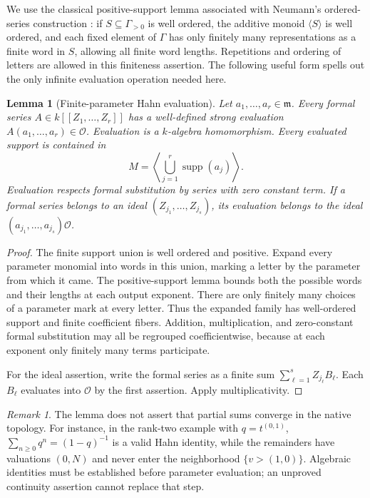 \documentclass[11pt,a4paper]{article}
\numberwithin{equation}{section}
\theoremstyle{plain}
\newtheorem{lemma}[lemma]{Lemma}
\theoremstyle{definition}
\theoremstyle{remark}
\newtheorem{remark}[remark]{Remark}
\newcommand{\OO}{\mathcal O}
\newcommand{\mm}{\mathfrak m}
\newcommand{\supp}{\operatorname{supp}}
\begin{document}
We use the classical positive-support lemma associated with Neumann's
ordered-series construction \cite{Neumann}: if $S\subseteq\Gamma_{>0}$
is well ordered, the additive monoid $\langle S\rangle$ is well ordered,
and each fixed element of $\Gamma$ has only finitely many
representations as a finite word in $S$, allowing all finite word
lengths. Repetitions and ordering of letters are allowed in this
finiteness assertion. The following useful form spells out the only
infinite evaluation operation needed here.

\begin{lemma}[Finite-parameter Hahn evaluation]\label{epd:lem:evaluation}
Let $a_1,\ldots,a_r\in\mm$. Every formal series
$A\in k[[Z_1,\ldots,Z_r]]$ has a well-defined strong evaluation
$A(a_1,\ldots,a_r)\in\OO$. Evaluation is a $k$-algebra homomorphism.
Every evaluated support is contained in
\[
 M=\left\langle\bigcup_{j=1}^r\supp(a_j)\right\rangle.
\]
Evaluation respects formal substitution by series with zero constant
term. If a formal series belongs to an ideal $(Z_{j_1},\ldots,Z_{j_s})$,
its evaluation belongs to the ideal $(a_{j_1},\ldots,a_{j_s})\OO$.
\end{lemma}
\begin{proof}
The finite support union is well ordered and positive. Expand every
parameter monomial into words in this union, marking a letter by the
parameter from which it came. The positive-support lemma bounds both
the possible words and their lengths at each output exponent. There
are only finitely many choices of a parameter mark at every letter.
Thus the expanded family has well-ordered support and finite
coefficient fibers. Addition, multiplication, and zero-constant formal
substitution may all be regrouped coefficientwise, because at each
exponent only finitely many terms participate.

For the ideal assertion, write the formal series as a finite sum
$\sum_{\ell=1}^s Z_{j_\ell}B_\ell$. Each $B_\ell$ evaluates into
$\OO$ by the first assertion. Apply multiplicativity.
\end{proof}

\begin{remark}\label{epd:rem:no-limits}
The lemma does not assert that partial sums converge in the native
topology. For instance, in the rank-two example with $q=t^{(0,1)}$,
$\sum_{n\geq0}q^n=(1-q)^{-1}$ is a valid Hahn identity, while the
remainders have valuations $(0,N)$ and never enter the neighborhood
$\{v>(1,0)\}$. Algebraic identities must be established before
parameter evaluation; an unproved continuity assertion cannot replace
that step.
\end{remark}
\end{document}
